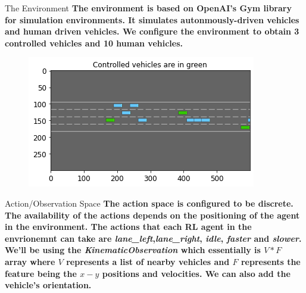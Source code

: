 \documentclass[final]{beamer}
\newlength{\onecolwid}
\begin{document}
\begin{frame}[t]
\begin{columns}[t]
\begin{column}{\onecolwid}
\begin{block}{The Environment}
\textbf{The environment is based on OpenAI's Gym library for simulation environments. It simulates autonmously-driven vehicles and human driven vehicles. We configure the environment to obtain 3 controlled vehicles
    and 10 human vehicles. 
}

\begin{figure}
\vspace*{0.2cm}
\includegraphics[width=0.6\linewidth]{images/highway-env.png}
\end{figure}

\end{block}    
          
\begin{block}{Action/Observation Space}
\textbf{The action space is configured to be discrete. The availability of the actions depends on the positioning of the agent
    in the environment. The actions that each RL agent in the envrionemnt can take are \textit{lane\_left},\textit{lane\_right},
    \textit{idle}, \textit{faster} and \textit{slower}.\\}
\textbf{We'll be using the \textit{KinematicObservation} which essentially is  $V*F$  array where $V$  
represents a list of nearby vehicles and $F$ represents the feature being the $x-y$  
positions and velocities. We can also add the vehicle's orientation. 
}


\end{block}
\end{column}
\end{columns}
\end{frame}
\end{document}
